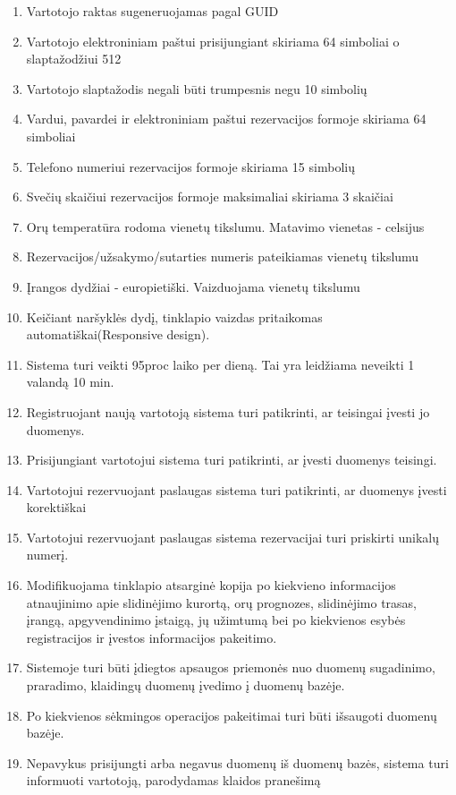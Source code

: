 \documentclass[oneside]{VUMIFPSkursinis}
\begin{document}
\begin{enumerate}
	\item Vartotojo raktas sugeneruojamas pagal GUID
	\item Vartotojo elektroniniam paštui prisijungiant skiriama 64 simboliai o slaptažodžiui 512
	\item Vartotojo slaptažodis negali būti trumpesnis negu 10 simbolių
	\item Vardui, pavardei ir elektroniniam paštui rezervacijos formoje skiriama 64 simboliai
	\item Telefono numeriui rezervacijos formoje skiriama 15 simbolių
	\item Svečių skaičiui rezervacijos formoje maksimaliai skiriama 3 skaičiai
	\item Orų temperatūra rodoma vienetų tikslumu. Matavimo vienetas - celsijus
	\item Rezervacijos/užsakymo/sutarties numeris pateikiamas vienetų tikslumu
	\item Įrangos dydžiai - europietiški. Vaizduojama vienetų tikslumu
	\item Keičiant naršyklės dydį, tinklapio vaizdas pritaikomas automatiškai(Responsive design).
	\item Sistema turi veikti 95proc laiko per dieną. Tai yra leidžiama neveikti 1 valandą 10 min.	
	\item Registruojant naują vartotoją sistema turi patikrinti, ar teisingai įvesti jo duomenys.
	\item Prisijungiant vartotojui sistema turi patikrinti, ar įvesti duomenys teisingi.
	\item Vartotojui rezervuojant paslaugas sistema turi patikrinti, ar duomenys įvesti korektiškai
	\item Vartotojui rezervuojant paslaugas sistema rezervacijai turi priskirti unikalų numerį.
	\item Modifikuojama tinklapio atsarginė kopija po kiekvieno informacijos atnaujinimo apie slidinėjimo kurortą, orų prognozes, slidinėjimo trasas, įrangą, apgyvendinimo įstaigą, jų užimtumą bei po kiekvienos esybės registracijos ir įvestos informacijos pakeitimo.
	\item Sistemoje turi būti įdiegtos apsaugos priemonės nuo duomenų sugadinimo, praradimo, klaidingų duomenų įvedimo į duomenų bazėje.
	\item Po kiekvienos sėkmingos operacijos pakeitimai turi būti išsaugoti duomenų bazėje.
	\item Nepavykus prisijungti arba negavus duomenų iš duomenų bazės, sistema turi informuoti vartotoją, parodydamas klaidos pranešimą

\end{enumerate}
\end{document}
